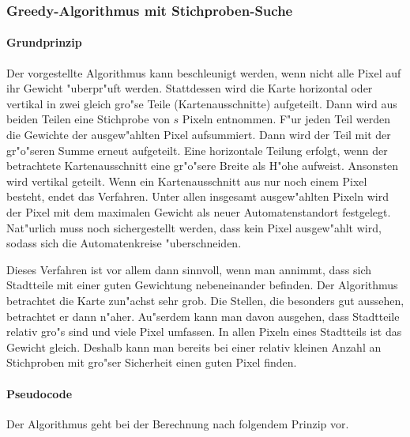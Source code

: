 \subsubsection{Greedy-Algorithmus mit Stichproben-Suche}
\paragraph{Grundprinzip}
Der vorgestellte Algorithmus kann beschleunigt werden, wenn nicht alle Pixel auf ihr Gewicht "uberpr"uft werden. Stattdessen wird die Karte horizontal oder vertikal in zwei gleich gro"se Teile (Kartenausschnitte) aufgeteilt. Dann wird aus beiden Teilen eine Stichprobe von \(s\) Pixeln entnommen. F"ur jeden Teil werden die Gewichte der ausgew"ahlten Pixel aufsummiert. Dann wird der Teil mit der gr"o"seren Summe erneut aufgeteilt. Eine horizontale Teilung erfolgt, wenn der betrachtete Kartenausschnitt eine gr"o"sere Breite als H"ohe aufweist. Ansonsten wird vertikal geteilt. Wenn ein Kartenausschnitt aus nur noch einem Pixel besteht, endet das Verfahren. Unter allen insgesamt ausgew"ahlten Pixeln wird der Pixel mit dem maximalen Gewicht als neuer Automatenstandort festgelegt. Nat"urlich muss noch sichergestellt werden, dass kein Pixel ausgew"ahlt wird, sodass sich die Automatenkreise "uberschneiden. 

Dieses Verfahren ist vor allem dann sinnvoll, wenn man annimmt, dass sich Stadtteile mit einer guten Gewichtung nebeneinander befinden. Der Algorithmus betrachtet die Karte zun"achst sehr grob. Die Stellen, die besonders gut aussehen, betrachtet er dann n"aher. Au"serdem kann man davon ausgehen, dass Stadtteile relativ gro"s sind und viele Pixel umfassen. In allen Pixeln eines Stadtteils ist das Gewicht gleich. Deshalb kann man bereits bei einer relativ kleinen Anzahl an Stichproben mit gro"ser Sicherheit einen guten Pixel finden.

\paragraph{Pseudocode}
Der Algorithmus geht bei der Berechnung nach folgendem Prinzip vor.

